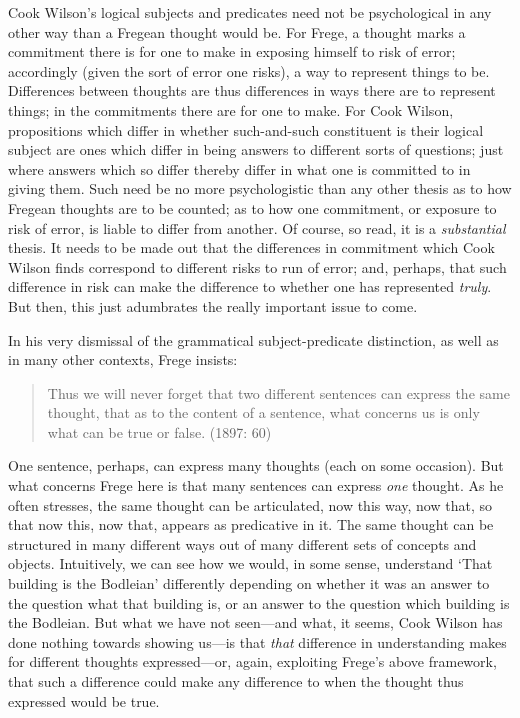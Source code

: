 Cook Wilson’s logical subjects and predicates need not be psychological in any other way than a Fregean thought would be. For Frege, a thought marks a commitment there is for one to make in exposing himself to risk of error; accordingly (given the sort of error one risks), a way to represent things to be. Differences between thoughts are thus differences in ways there are to represent things; in the commitments there are for one to make. For Cook Wilson, propositions which differ in whether such-and-such constituent is their logical subject are ones which differ in being answers to different sorts of questions; just where answers which so differ thereby differ in what one is committed to in giving them. Such need be no more psychologistic than any other thesis as to how Fregean thoughts are to be counted; as to how one commitment, or exposure to risk of error, is liable to differ from another. Of course, so read, it is a \emph{substantial} thesis. It needs to be made out that the differences in commitment which Cook Wilson finds correspond to different risks to run of error; and, perhaps, that such difference in risk can make the difference to whether one has represented \emph{truly}. But then, this just adumbrates the really important issue to come.

In his very dismissal of the grammatical subject-predicate distinction, as well as in many other contexts, Frege insists:
\begin{quote}
	Thus we will never forget that two different sentences can express the same thought, that as to the content of a sentence, what concerns us is only what can be true or false. (1897: 60)
\end{quote}
One sentence, perhaps, can express many thoughts (each on some occasion). But what concerns Frege here is that many sentences can express \emph{one} thought. As he often stresses, the same thought can be articulated, now this way, now that, so that now this, now that, appears as predicative in it. The same thought can be structured in many different ways out of many different sets of concepts and objects. Intuitively, we can see how we would, in some sense, understand `That building is the Bodleian' differently depending on whether it was an answer to the question what that building is, or an answer to the question which building is the Bodleian. But what we have not seen---and what, it seems, Cook Wilson has done nothing towards showing us---is that \emph{that} difference in understanding makes for different thoughts expressed---or, again, exploiting Frege’s above framework, that such a difference could make any difference to when the thought thus expressed would be true.

